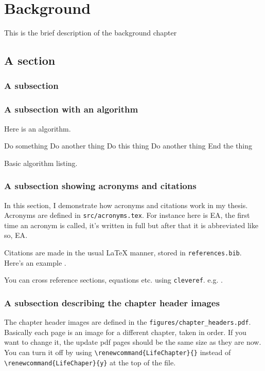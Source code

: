 \renewcommand{\BrainFuckChapter}{y}
\renewcommand{\LifeChapter}{y}
\chapter{Background}
\label{chap:background}
\chaptertoc{}

\begin{chapterabstract}
This is the brief description of the background chapter
\end{chapterabstract}

\section{A section}
\label{sec:bg_mri_physics}
\blindtext

\subsection{A subsection}
\label{sec:bg_nuclearmagnetism}
\blindmathpaper

\subsection{A subsection with an algorithm}
\label{sec:bg_algorithm}
Here is an algorithm.
\begin{algorithm}
  \begin{algorithmic}
    \State Do something
    \State Do another thing
    \State Do this thing
    \State Do another thing
    \EndWhile
    \State End the thing
  \end{algorithmic}
  \caption{Basic algorithm listing.}
  \label{alg:MC_random_walk}
\end{algorithm}

\subsection{A subsection showing acronyms and citations}
\label{sec:bg_acronyms}
In this section, I demonstrate how acronyms and citations work in my thesis. Acronyms are defined in \texttt{src/acronyms.tex}. For instance here is \ac{EA}, the first time an acronym is called, it's written in full but after that it is abbreviated like so, \ac{EA}.

Citations are made in the usual LaTeX manner, stored in \texttt{references.bib}. Here's an example \cite{ref1,ref2}.

You can cross reference sections, equations etc. using \texttt{cleveref}. e.g. .

\subsection{A subsection describing the chapter header images}
The chapter header images are defined in the \texttt{figures/chapter\_headers.pdf}. Basically each page is an image for a different chapter, taken in order. If you want to change it, the update pdf pages should be the same size as they are now. You can turn it off by using \verb|\renewcommand{LifeChapter}{}| instead of \verb|\renewcommand{LifeChaper}{y}| at the top of the file.
